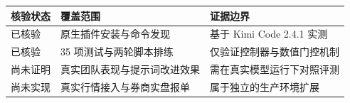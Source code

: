 \begin{tabular}{@{}P{3.0cm}P{4.6cm}P{4.9cm}@{}}
\toprule
\textbf{核验状态} & \textbf{覆盖范围} & \textbf{证据边界} \\
\midrule
已核验 & 原生插件安装与命令发现 & 基于 Kimi Code 2.4.1 实测 \\
已核验 & 35 项测试与两轮脚本排练 & 仅验证控制器与数值门控机制 \\
尚未证明 & 真实团队表现与提示词改进效果 & 需在真实模型运行下对照评测 \\
尚未实现 & 真实行情接入与券商实盘报单 & 属于独立的生产环境扩展 \\
\bottomrule
\end{tabular}
